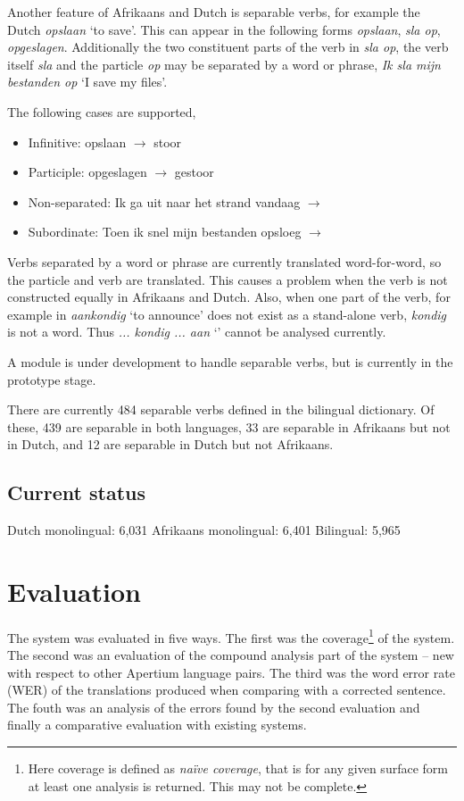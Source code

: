 \documentclass[11pt]{article}
\begin{document}
Another feature of Afrikaans and Dutch is separable verbs, for example
the Dutch {\em opslaan} `to save'. This can appear in the following
forms {\em opslaan}, {\em sla op}, {\em opgeslagen}. Additionally the two constituent
parts of the verb in {\em sla op}, the verb itself {\em sla} and the particle
{\em op} may be separated by a word or phrase, {\em Ik sla mijn bestanden op}
 `I save my files'.

The following cases are supported,

\begin{itemize}
\item Infinitive: opslaan $\rightarrow$ stoor 
\item Participle: opgeslagen $\rightarrow$ gestoor
\item Non-separated: Ik ga uit naar het strand vandaag $\rightarrow$
\item Subordinate: Toen ik snel mijn bestanden opsloeg $\rightarrow$ 
\end{itemize}

Verbs separated by a word or phrase are currently translated word-for-word,
so the particle and verb are translated. This causes a problem when the
verb is not constructed equally in Afrikaans and Dutch. Also, when one part
of the verb, for example in {\em aankondig} `to announce' does not exist as
a stand-alone verb, {\em kondig} is not a word. Thus {\em ... kondig ... aan} `'
cannot be analysed currently.

A module is under development to handle separable verbs, but is currently
in the prototype stage.

There are currently 484 separable verbs defined in the bilingual
dictionary. Of these, 439 are separable in both languages, 33 are
separable in Afrikaans but not in Dutch, and 12 are separable in
Dutch but not Afrikaans.

\subsection{Current status}

Dutch monolingual: 6,031
Afrikaans monolingual: 6,401
Bilingual: 5,965

\section{Evaluation}

The system was evaluated in five ways. The first was the 
coverage\footnote{Here coverage is defined as \emph{na\"ive coverage}, 
that is for any given surface form at least one analysis is returned. This 
may not be complete.} of the system. The second was an evaluation of the 
compound analysis part of the system -- new with respect to other 
Apertium language pairs. The third was the word error 
rate (WER) of the translations produced when comparing with a 
corrected sentence. The fouth was an analysis of the errors found by the second
evaluation and finally a comparative evaluation with existing systems.
\end{document}
